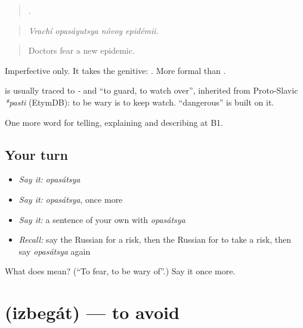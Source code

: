 \begin{quote}
   .
\end{quote}

\begin{quote}
\emph{Vrachí opasáyutsya nóvoy epidémii.}
\end{quote}

\begin{quote}
Doctors fear a new epidemic.
\end{quote}

Imperfective only. It takes the genitive: \emph{ }. More formal than \emph{}.

\begin{cousinweb}
\textbf{} is usually traced to \emph{-} and \emph{} \textquotedblleft{}to guard, to watch over\textquotedblright{}, inherited from Proto-Slavic \emph{*pasti} (EtymDB): to be wary is to keep watch. \emph{} \textquotedblleft{}dangerous\textquotedblright{} is built on it.
\end{cousinweb}

\begin{grammarlens}[title={What you've built}]
One more word for telling, explaining and describing at B1.
\end{grammarlens}

\subsection*{Your turn}
\begin{itemize}
\raggedright
  \item \emph{Say it:} \emph{opasátsya}
  \item \emph{Say it:} \emph{opasátsya}, once more
  \item \emph{Say it:} a sentence of your own with \emph{opasátsya}
  \item \emph{Recall:} say the Russian for a risk, then the Russian for to take a risk, then say \emph{opasátsya} again
\end{itemize}

\begin{tcolorbox}[breakable,colback=teal!4,colframe=teal!35!black,title={Before you move on}]
What does  mean? (\textquotedblleft{}To fear, to be wary of\textquotedblright{}.) Say it once more.
\end{tcolorbox}
\section[\texorpdfstring{\ru{избегать} (izbegát)}{избегать (izbegát)}]{ (izbegát) — to avoid}

